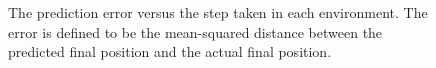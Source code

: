 \begin{figure}[!t]
\centering
{}
{}
\vfil
{}
{}
\caption{The prediction error versus the step taken in each environment.
The error is defined to be the mean-squared distance between the predicted final position and the actual final position.
}
\label{dynamics_learning}
\end{figure}

